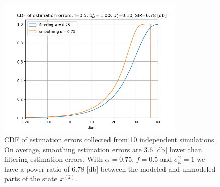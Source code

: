 \documentclass[oneside,12pt]{article}
\begin{document}
\begin{figure}
    \centering
        \includegraphics[width=0.8\textwidth]{./unmodeledBehaviour}
        \caption{\label{fig:unmodeledBehaviour}CDF of estimation errors collected from 10 independent simulations. On average, smoothing estimation errors are 3.6 [db] lower than filtering estimation errors. With $\alpha=0.75$, $f=0.5$ and $\sigma_\omega^2=1$ we have a power ratio of 6.78 [db] between the modeled and unmodeled parts of the state $x^{(2)}$.}
\end{figure}
%
\end{document}
